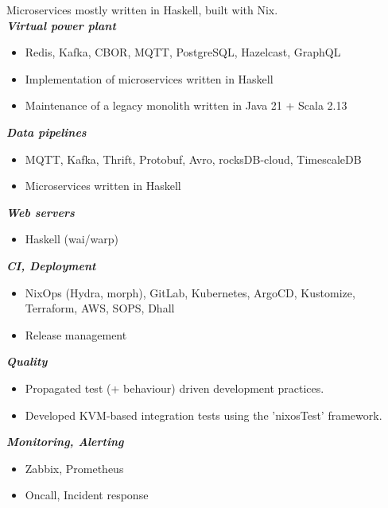 \documentclass[11pt,a4paper,ngerman,sans]{moderncv}
\begin{document}
{
  Microservices mostly written in Haskell, built with Nix.\newline
  \\
	\textbf{\emph{Virtual power plant}}
  \begin{itemize}
    \item Redis, Kafka, CBOR, MQTT, PostgreSQL, Hazelcast, GraphQL
    \item Implementation of microservices written in Haskell
    \item Maintenance of a legacy monolith written in Java 21 + Scala 2.13
    \\
  \end{itemize}
	\textbf{\emph{Data pipelines}}
  \begin{itemize}
    \item MQTT, Kafka, Thrift, Protobuf, Avro, rocksDB-cloud, TimescaleDB
    \item Microservices written in Haskell
    \\
  \end{itemize}
	\textbf{\emph{Web servers}}
  \begin{itemize}
    \item Haskell (wai/warp)
    \\
  \end{itemize}
	\textbf{\emph{CI, Deployment}}
  \begin{itemize}
    \item NixOps (Hydra, morph), GitLab, Kubernetes, ArgoCD, Kustomize, Terraform, AWS, SOPS, Dhall
    \item Release management
    \\
  \end{itemize}
	\textbf{\emph{Quality}}
  \begin{itemize}
    \item Propagated test (+ behaviour) driven development practices.
    \item Developed KVM-based integration tests using the 'nixosTest' framework.
    \\
  \end{itemize}
	\textbf{\emph{Monitoring, Alerting}}
  \begin{itemize}
    \item Zabbix, Prometheus
    \item Oncall, Incident response
    \\
  \end{itemize}
}
\end{document}
